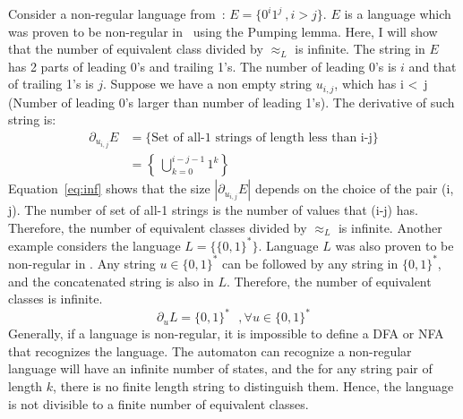 \documentclass[a4paper,12pt]{article}
\begin{document}
Consider a non-regular language from~\cite{sip}: $E=\{0^{i}1^{j}\ , i > j\}$. $E$ is a language which was proven to be non-regular in~\cite{sip} using the Pumping lemma. Here, I will show that the number of equivalent class divided by $\approx_{L}$ is infinite. The string in $E$ has 2 parts of leading 0's and trailing 1's. The number of leading 0's is $i$ and that of trailing 1's is $j$. Suppose we have a non empty string $u_{i,j}$, which has i \textless\ j (Number of leading 0's larger than
number of leading 1's). The derivative of such string is:
\begin{equation} \label{eq:inf}
    \begin{aligned}
        \partial_{u_{i,j}}E & = \{\mbox{Set of all-1 strings of length less than i-j}\} \\
        & = \left \{ \ \bigcup\limits_{k=0}^{i-j-1}1^{k} \right \}    
    \end{aligned}
\end{equation}
\noindent
Equation~\eqref{eq:inf} shows that the size $|\partial_{u_{i,j}}E|$ depends on the choice of the pair (i, j). The number of set of all-1 strings is the number of values that (i-j) has. Therefore, the number of equivalent classes divided by $\approx_{L}$ is infinite. Another example considers the language $L = \{ \{0,1\}^{*} \}$. Language $L$ was also proven to be non-regular in \cite{sip}. Any string $u \in \{0,1\}^{*}$ can be followed by any string in $\{0,1\}^{*}$, and the
concatenated string is also in $L$. Therefore, the number of equivalent classes is infinite.
\begin{equation}
    \partial_{u}L = \{0,1\}^{*} \mbox{ }, \forall u \in \{0,1\}^{*} 
\end{equation}
Generally, if a language is non-regular, it is impossible to define a DFA or NFA that recognizes the language. The automaton can recognize a non-regular language will have an infinite number of states, and the for any string pair of length $k$, there is no finite length string to distinguish them. Hence, the language is not divisible to a finite number of equivalent classes. 
\end{document}
